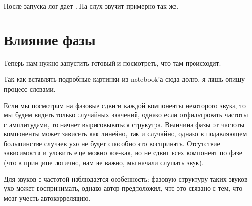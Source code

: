 \documentclass[a4paper,12pt]{report}
\begin{document}
    После запуска лог дает . На слух звучит примерно так же.
    
    \chapter{Влияние фазы}
    
    Теперь нам нужно запустить готовый  и посмотреть, что там происходит.
    
    Так как вставлять подробные картинки из notebook'а сюда долго, я лишь опишу процесс словами.
    
    Если мы посмотрим на фазовые сдвиги каждой компоненты некоторого звука, то мы будем видеть только  случайных значений, однако если отфильтровать частоты с  амплитудами, то начнет вырисовываться струкутра. Величина фазы от частоты компоненты может зависеть как линейно, так и случайно, однако в подавляющем большинстве случаев ухо не будет способно это воспринять. Отсутствие зависимости и  уловить еще можно кое-как, но не сдвиг всех компонент по фазе (что в принципе логично, нам не важно,  мы начали слушать звук). 
    
    Для звуков с  частотой наблюдается особенность: фазовую структуру таких звуков ухо может воспринимать, однако автор предположил, что это связано с тем, что мозг  учесть автокорреляцию.
    
    
\end{document}
